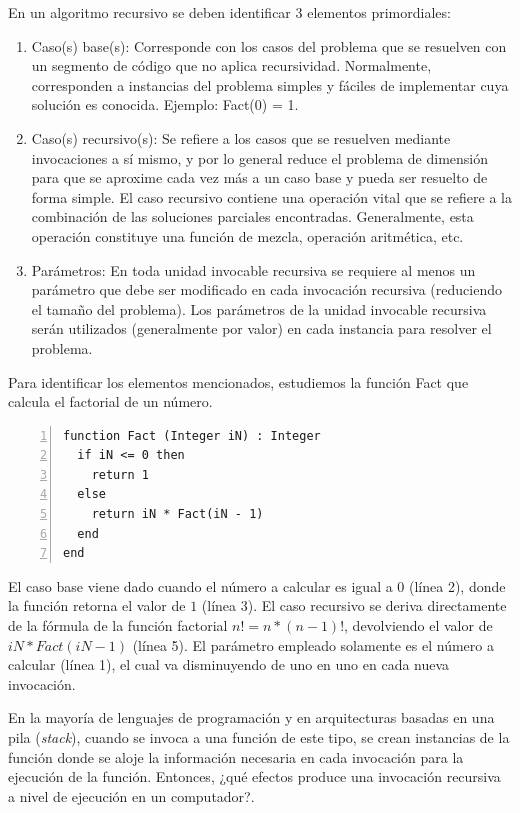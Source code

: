 En un algoritmo recursivo se deben identificar 3 elementos primordiales:
\begin{enumerate}
\item Caso(s) base(s): Corresponde con los casos del problema que se resuelven con un segmento de código que no aplica recursividad. Normalmente, corresponden a instancias del problema simples y fáciles de implementar cuya solución es conocida. Ejemplo: Fact(0) = 1.
\item Caso(s) recursivo(s): Se refiere a los casos que se resuelven mediante invocaciones a sí mismo, y por lo general reduce el problema de dimensión para que se aproxime cada vez más a un caso base y pueda ser resuelto de forma simple. El caso recursivo contiene una operación vital que se refiere a la combinación de las soluciones parciales encontradas. Generalmente, esta operación constituye una función de mezcla, operación aritmética, etc.
\item Parámetros: En toda unidad invocable recursiva se requiere al menos un parámetro que debe ser modificado en cada invocación recursiva (reduciendo el tamaño del problema). Los parámetros de la unidad invocable recursiva serán utilizados (generalmente por valor) en cada instancia para resolver el problema.
\end{enumerate}

Para identificar los elementos mencionados, estudiemos la función Fact que calcula el factorial de un número.

\begin{lstlisting}[upquote=true, numbers=left, language=pseudo]
function Fact (Integer iN) : Integer
  if iN <= 0 then
    return 1
  else
    return iN * Fact(iN - 1)
  end
end
\end{lstlisting}

El caso base viene dado cuando el número a calcular es igual a $0$ (línea 2), donde la función retorna el valor de $1$ (línea 3). El caso recursivo se deriva directamente de la fórmula de la función factorial $n! = n*(n-1)!$, devolviendo el valor de $iN * Fact(iN -1)$ (línea 5). El parámetro empleado solamente es el número a calcular (línea 1), el cual va disminuyendo de uno en uno en cada nueva invocación.

En la mayoría de lenguajes de programación y en arquitecturas basadas en una pila (\textit{stack}), cuando se invoca a una función de este tipo, se crean instancias de la función donde se aloje la información necesaria en cada invocación para la ejecución de la función. Entonces, ¿qué efectos produce una invocación recursiva a nivel de ejecución en un computador?.

